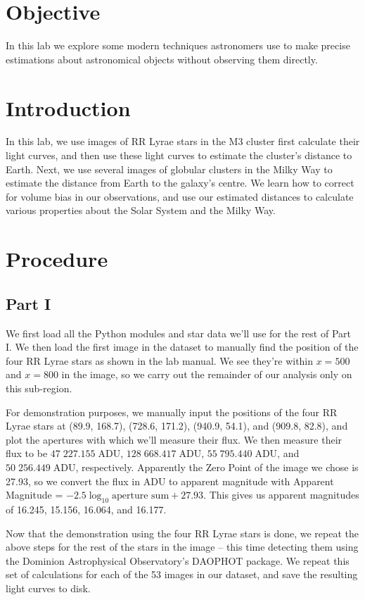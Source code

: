 \documentclass[11pt]{article}
\begin{document}
\section{Objective}
In this lab we explore some modern techniques astronomers use to make precise estimations about astronomical objects without observing them directly.


\section{Introduction}
In this lab, we use images of RR Lyrae stars in the M3 cluster first calculate their light curves, and then use these light curves to estimate the cluster's distance to Earth.
Next, we use several images of globular clusters in the Milky Way to estimate the distance from Earth to the galaxy's centre.
We learn how to correct for volume bias in our observations, and use our estimated distances to calculate various properties about the Solar System and the Milky Way.



\section{Procedure}
\subsection*{Part I}
We first load all the Python modules and star data we'll use for the rest of Part I.
We then load the first image in the dataset to manually find the position of the four RR Lyrae stars as shown in the lab manual.
We see they're within $x = 500$ and $x = 800$ in the image, so we carry out the remainder of our analysis only on this sub-region.

For demonstration purposes, we manually input the positions of the four RR Lyrae stars at (89.9, 168.7), (728.6, 171.2), (940.9, 54.1), and (909.8, 82.8), and plot the apertures with which we'll measure their flux.
We then measure their flux to be $47\;227.155\;\textrm{ADU}$, $128\;668.417\;\textrm{ADU}$, $55\;795.440\;\textrm{ADU}$, and $50\;256.449\;\textrm{ADU}$, respectively.
Apparently the Zero Point of the image we chose is 27.93, so we convert the flux in ADU to apparent magnitude with Apparent Magnitude = $-2.5 \log_{10}\textrm{aperture sum} + 27.93$.
This gives us apparent magnitudes of 16.245, 15.156, 16.064, and 16.177.

Now that the demonstration using the four RR Lyrae stars is done, we repeat the above steps for the rest of the stars in the image -- this time detecting them using the Dominion Astrophysical Observatory's DAOPHOT package.
We repeat this set of calculations for each of the 53 images in our dataset, and save the resulting light curves to disk.
\end{document}
